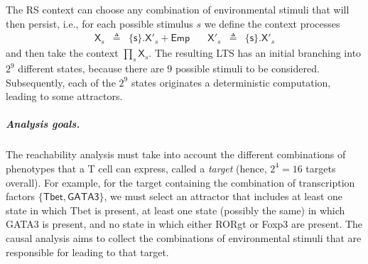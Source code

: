 The RS context can choose any combination of environmental stimuli that will then persist, i.e., for each possible stimulus $s$ we define the context processes
\[
\begin{array}{rllrll}
\mathsf{X}_s & \triangleq & \{\mathsf{s}\}.\mathsf{X}'_s + \mathsf{Emp} &\quad
\mathsf{X}'_s & \triangleq & \{\mathsf{s}\}.\mathsf{X}'_s
\end{array}
\]
and then take the context $\prod_s \mathsf{X}_s$.
The resulting LTS has an initial branching into $2^9$ different states, because there are $9$ possible stimuli to be considered. Subsequently, each of the $2^9$ states originates a deterministic computation, leading to some attractors. 

\subparagraph*{Analysis goals.}
The reachability analysis must take into account the different combinations of phenotypes that a T cell can express, called a \emph{target} (hence, $2^4=16$ targets overall).
For example, for the target containing the combination of transcription factors $\{\mathsf{Tbet},\mathsf{GATA3}\}$, we must select an attractor that includes at least one state in which Tbet is present, at least one state (possibly the same) in which GATA3 is present, and no state in which either RORgt or Foxp3 are present. 
The causal analysis aims to collect the combinations of environmental stimuli that are responsible for leading to that target.

